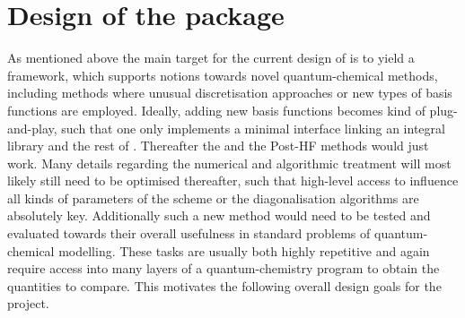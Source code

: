 \section{Design of the \molsturm package}
\label{sec:MolsturmDesign}

As mentioned above the main target for the current design of \molsturm
is to yield a framework,
which supports notions towards novel quantum-chemical methods,
including methods where unusual discretisation approaches
or new types of basis functions are employed.
Ideally, adding new basis functions becomes kind of plug-and-play,
such that one only implements a minimal interface
linking an integral library and the rest of \molsturm.
Thereafter the \SCF and the Post-HF methods would just work.
Many details regarding the numerical and algorithmic treatment
will most likely still need to be optimised thereafter,
such that high-level access to influence
all kinds of parameters of the \SCF scheme or the
diagonalisation algorithms are absolutely key.
Additionally such a new method would need to be tested and evaluated
towards their overall usefulness in standard problems
of quantum-chemical modelling.
These tasks are usually both highly repetitive and again
require access into many layers of a quantum-chemistry program
to obtain the quantities to compare.
This motivates the following overall design goals for the \molsturm project.

